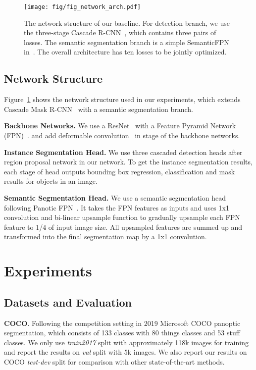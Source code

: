 \documentclass[letterpaper]{article} \usepackage{aaai21}  \usepackage{times}  \usepackage{helvet} \usepackage{courier}  \usepackage[hyphens]{url}  \usepackage{graphicx} \urlstyle{rm} \def\UrlFont{\rm}  \usepackage{natbib}  \usepackage{caption} \frenchspacing  \setlength{\pdfpagewidth}{8.5in}  \setlength{\pdfpageheight}{11in}
\begin{document}
 \begin{figure}[t]
  \centering
  \texttt{[image: fig/fig\_network\_arch.pdf]}
\caption{The network structure of our baseline. For detection branch, we use the three-stage  
  Cascade R-CNN~\cite{cai2017cascade}, which contains three pairs of losses. 
  The semantic segmentation branch is a simple SemanticFPN in~\cite{panopticFPNkirillov2019}. 
  The overall architecture has ten losses to be jointly optimized. }
  \label{fig:network_structure}
\end{figure}

 \subsection{Network Structure}
 \label{subsec:Network-Structure.}
 
 Figure~\ref{fig:network_structure} shows the network structure used in our experiments,
 which extends Cascade Mask R-CNN~\cite{cai2017cascade} with a semantic segmentation branch.


 \noindent
 \textbf{Backbone Networks.} 
 We use a ResNet~\cite{resnetHe2015}
 with a Feature Pyramid Network (FPN)~\cite{fpnlin2017}. 
 and add deformable convolution~\cite{dai2017deformable} 
 in stage  of the backbone networks.
 
 \noindent
 \textbf{Instance Segmentation Head.} 
 We use three cascaded detection heads after region proposal network 
 in our network. 
 To get the instance segmentation results, each stage of head outputs bounding box regression, 
 classification and mask results for objects in an image. 


 \noindent
 \textbf{Semantic Segmentation Head.} 
 We use a semantic segmentation head following Panotic FPN~\cite{panopticFPNkirillov2019}.
 It takes the FPN features as inputs and uses 1x1 convolution and bi-linear upsample 
 function to gradually upsample each FPN feature to 1/4 of input image size.
All upsampled features are summed up and transformed into the final segmentation map 
 by a 1x1 convolution.








 \section{Experiments}
\label{sec:exp}

 \subsection{Datasets and Evaluation}
 \noindent
 \textbf{COCO}. Following the competition setting in 2019 Microsoft COCO panoptic segmentation, 
 which consists of 133 classes with 80 things classes and 53 stuff classes. We only use \textit{train2017} 
 split with approximately 118k images for training and report the results on \textit{val} split 
 with 5k images. We also report our results on COCO \textit{test-dev} split for comparison 
 with other state-of-the-art methods.
 
\end{document}
